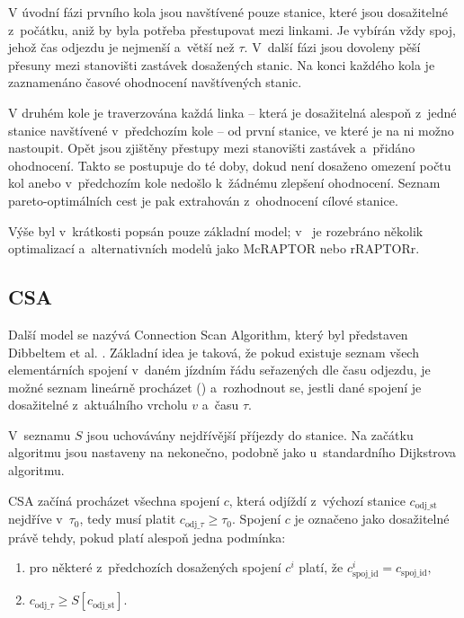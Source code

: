 V úvodní fázi prvního kola jsou navštívené pouze stanice, které jsou dosažitelné z~počátku, aniž by byla potřeba přestupovat mezi linkami. Je vybírán vždy spoj, jehož čas odjezdu je nejmenší a~větší než \(\tau\). V~další fázi jsou dovoleny pěší přesuny mezi stanovišti zastávek dosažených stanic. Na konci každého kola je zaznamenáno časové ohodnocení navštívených stanic. 

V druhém kole je traverzována každá linka -- která je dosažitelná alespoň z~jedné stanice navštívené v~předchozím kole -- od první stanice, ve které je na ni možno nastoupit. Opět jsou zjištěny přestupy mezi stanovišti zastávek a~přidáno ohodnocení. Takto se postupuje do té doby, dokud není dosaženo omezení počtu kol anebo v~předchozím kole nedošlo k~žádnému zlepšení ohodnocení. Seznam pareto-optimálních cest je pak extrahován z~ohodnocení cílové stanice.

Výše byl v~krátkosti popsán pouze základní model; v~\cite{dellingRAPTOR} je rozebráno několik optimalizací a~alternativních modelů jako McRAPTOR nebo rRAPTORr.

\subsection{CSA}
\label{CSAtheory}
Další model se nazývá Connection Scan Algorithm, který byl představen Dibbeltem et al. \cite{dibbelt2017CSA}. Základní idea je taková, že pokud existuje seznam všech elementárních spojení v~daném jízdním řádu seřazených dle času odjezdu, je možné seznam lineárně procházet () a~rozhodnout se, jestli dané spojení je dosažitelné z~aktuálního vrcholu \(v\) a~času $\tau$.

V~seznamu $S$ jsou uchovávány nejdřívější příjezdy do stanice. Na začátku algoritmu jsou nastaveny na nekonečno, podobně jako u~standardního Dijkstrova algoritmu.

CSA začíná procházet všechna spojení $c$, která odjíždí z~výchozí stanice $c_{\text{odj\_st}}$ nejdříve v~$\tau_0$, tedy musí platit $c_{\text{odj\_}\tau} \geq \tau_0$. Spojení $c$ je označeno jako dosažitelné právě tehdy, pokud platí alespoň jedna podmínka:

\begin{enumerate}[label = \normalfont\itembox{\roman{enumi})}]
	\item pro některé z~předchozích dosažených spojení $c^i$ platí, že $c^i_{\text{spoj\_id}} = c_{\text{spoj\_id}},$
	\item $c_{\text{odj\_}\tau} \geq S[c_{\text{odj\_st}}]$.
\end{enumerate}

